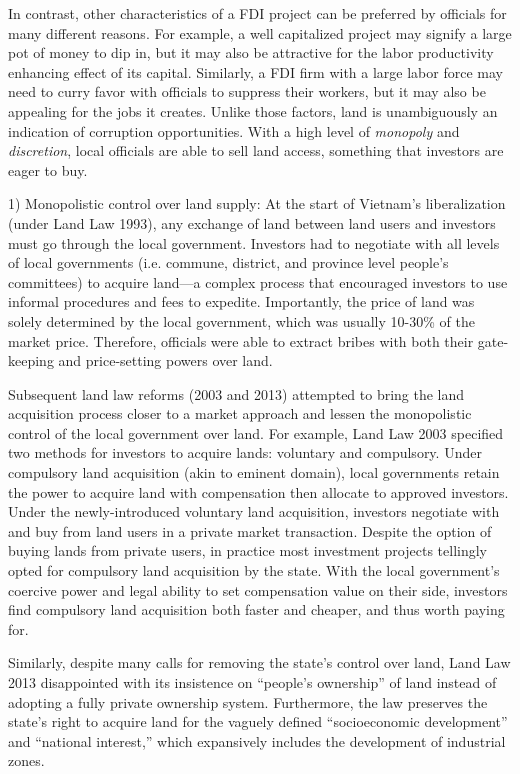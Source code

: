 In contrast, other characteristics of a FDI project can be preferred by officials for many different reasons. For example, a well capitalized project may signify a large pot of money to dip in, but it may also be attractive for the labor productivity enhancing effect of its capital. Similarly, a FDI firm with a large labor force may need to curry favor with officials to suppress their workers, but it may also be appealing for the jobs it creates.  Unlike those factors, land is unambiguously an indication of corruption opportunities. With a high level of \textit{monopoly} and \textit{discretion}, local officials are able to sell land access, something that investors are eager to buy.

1) Monopolistic control over land supply: At the start of Vietnam's liberalization (under Land Law 1993), any exchange of land between land users and investors must go through the local government. Investors had to negotiate with all levels of local governments (i.e. commune, district, and province level people's committees) to acquire land---a complex process that encouraged investors to use informal procedures and fees to expedite. Importantly, the price of land was solely determined by the local government, which was usually 10-30\% of the market price. Therefore, officials were able to extract bribes with both their gate-keeping and price-setting powers over land.

Subsequent land law reforms (2003 and 2013) attempted to bring the land acquisition process closer to a market approach and lessen the monopolistic control of the local government over land. For example, Land Law 2003 specified two methods for investors to acquire lands: voluntary and compulsory. Under compulsory land acquisition (akin to eminent domain), local governments retain the power to acquire land with compensation then allocate to approved investors. Under the newly-introduced voluntary land acquisition, investors negotiate with and buy from land users in a private market transaction. Despite the option of buying lands from private users, in practice most investment projects tellingly opted for compulsory land acquisition by the state. With the local government's coercive power and legal ability to set compensation value on their side, investors find compulsory land acquisition both faster and cheaper, and thus worth paying for.

Similarly, despite many calls for removing the state's control over land, Land Law 2013 disappointed with its insistence on ``people's ownership'' of land instead of adopting a fully private ownership system. Furthermore, the law preserves the state's right to acquire land for the vaguely defined ``socioeconomic development'' and ``national interest,'' which expansively includes the development of industrial zones.

